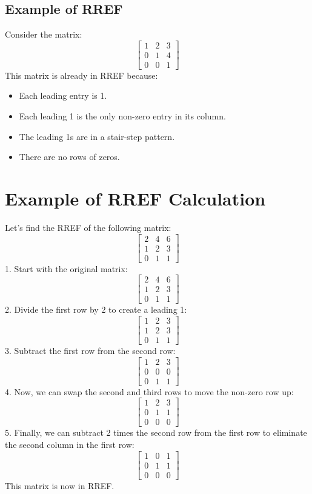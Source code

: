 \documentclass{article}
\begin{document}
\subsection*{Example of RREF}
Consider the matrix:
\[  \begin{bmatrix}
    1 & 2 & 3 \\
    0 & 1 & 4 \\
    0 & 0 & 1
\end{bmatrix} \]
This matrix is already in RREF because:
\begin{itemize}
    \item Each leading entry is 1.
    \item Each leading 1 is the only non-zero entry in its column.
    \item The leading 1s are in a stair-step pattern.
    \item There are no rows of zeros.
\end{itemize}

\section*{Example of RREF Calculation}
Let's find the RREF of the following matrix:
\[  \begin{bmatrix}
    2 & 4 & 6 \\
    1 & 2 & 3 \\
    0 & 1 & 1
\end{bmatrix} \]
1. Start with the original matrix:
\[  \begin{bmatrix}
    2 & 4 & 6 \\
    1 & 2 & 3 \\
    0 & 1 & 1
\end{bmatrix} \]
2. Divide the first row by 2 to create a leading 1:
\[  \begin{bmatrix}
    1 & 2 & 3 \\
    1 & 2 & 3 \\
    0 & 1 & 1
\end{bmatrix} \]
3. Subtract the first row from the second row:
\[  \begin{bmatrix}
    1 & 2 & 3 \\
    0 & 0 & 0 \\
    0 & 1 & 1
\end{bmatrix} \]
4. Now, we can swap the second and third rows to move the non-zero row up:
\[  \begin{bmatrix}
    1 & 2 & 3 \\
    0 & 1 & 1 \\
    0 & 0 & 0
\end{bmatrix} \]
5. Finally, we can subtract 2 times the second row from the first row to eliminate the second column in the first row:
\[  \begin{bmatrix}
    1 & 0 & 1 \\
    0 & 1 & 1 \\
    0 & 0 & 0
\end{bmatrix} \]
This matrix is now in RREF.
\end{document}
